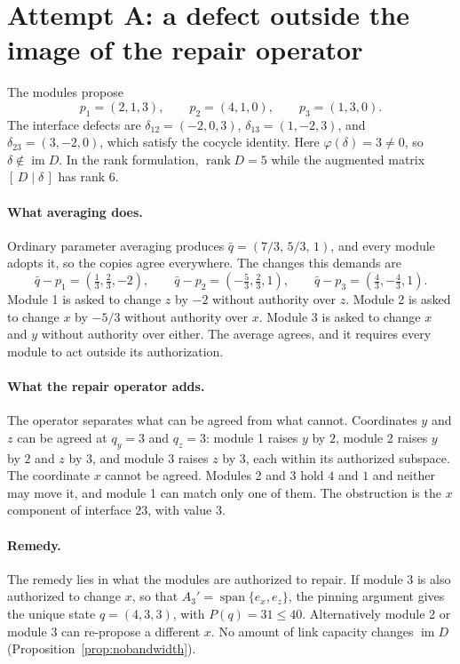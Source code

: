 \documentclass[11pt,openany]{book}
\theoremstyle{remark}
\begin{document}
\section[Attempt A: a defect outside the image]{Attempt A: a defect outside the image of the repair operator}

The modules propose
\[
p_1=(2,1,3),\qquad p_2=(4,1,0),\qquad p_3=(1,3,0).
\]
The interface defects are $\delta_{12}=(-2,0,3)$, $\delta_{13}=(1,-2,3)$, and $\delta_{23}=(3,-2,0)$, which satisfy the cocycle identity. Here $\varphi(\delta)=3\ne0$, so $\delta\notin\operatorname{im}D$. In the rank formulation, $\operatorname{rank}D=5$ while the augmented matrix $[\,D\mid\delta\,]$ has rank $6$.

\paragraph{What averaging does.} Ordinary parameter averaging produces $\bar q=(7/3,\,5/3,\,1)$, and every module adopts it, so the copies agree everywhere. The changes this demands are
\[
\bar q-p_1=(\tfrac13,\tfrac23,-2),\qquad \bar q-p_2=(-\tfrac53,\tfrac23,1),\qquad \bar q-p_3=(\tfrac43,-\tfrac43,1).
\]
Module 1 is asked to change $z$ by $-2$ without authority over $z$. Module 2 is asked to change $x$ by $-5/3$ without authority over $x$. Module 3 is asked to change $x$ and $y$ without authority over either. The average agrees, and it requires every module to act outside its authorization.

\paragraph{What the repair operator adds.} The operator separates what can be agreed from what cannot. Coordinates $y$ and $z$ can be agreed at $q_y=3$ and $q_z=3$: module 1 raises $y$ by $2$, module 2 raises $y$ by $2$ and $z$ by $3$, and module 3 raises $z$ by $3$, each within its authorized subspace. The coordinate $x$ cannot be agreed. Modules 2 and 3 hold $4$ and $1$ and neither may move it, and module 1 can match only one of them. The obstruction is the $x$ component of interface $23$, with value $3$.

\paragraph{Remedy.} The remedy lies in what the modules are authorized to repair. If module 3 is also authorized to change $x$, so that $A_3'=\operatorname{span}\{e_x,e_z\}$, the pinning argument gives the unique state $q=(4,3,3)$, with $P(q)=31\le40$. Alternatively module 2 or module 3 can re-propose a different $x$. No amount of link capacity changes $\operatorname{im}D$ (Proposition~\ref{prop:nobandwidth}).
\end{document}
